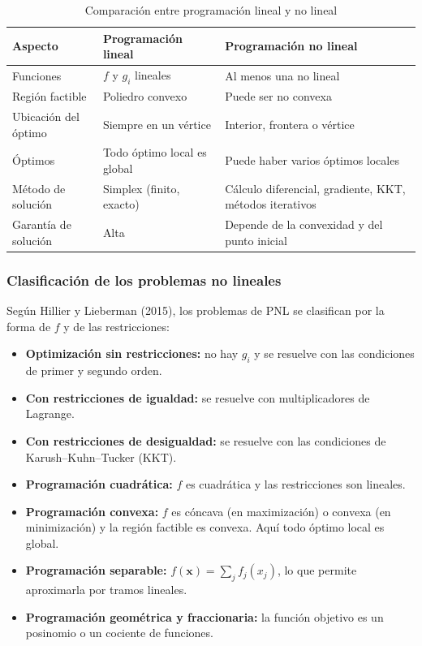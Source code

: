 \documentclass[12pt,letterpaper]{article}
\begin{document}
\begin{table}[H]
	\centering
	\caption{Comparación entre programación lineal y no lineal}
	\label{tab:comparacion}
	\small
	\begin{tabular}{p{3.2cm}p{5.6cm}p{5.6cm}}
		\toprule
		\textbf{Aspecto}     & \textbf{Programación lineal} & \textbf{Programación no lineal}                         \\
		\midrule
		Funciones            & $f$ y $g_i$ lineales         & Al menos una no lineal                                  \\
		Región factible      & Poliedro convexo             & Puede ser no convexa                                    \\
		Ubicación del óptimo & Siempre en un vértice        & Interior, frontera o vértice                            \\
		Óptimos              & Todo óptimo local es global  & Puede haber varios óptimos locales                      \\
		Método de solución   & Simplex (finito, exacto)     & Cálculo diferencial, gradiente, KKT, métodos iterativos \\
		Garantía de solución & Alta                         & Depende de la convexidad y del punto inicial            \\
		\bottomrule
	\end{tabular}
\end{table}

\subsubsection{Clasificación de los problemas no lineales}

Según Hillier y Lieberman (2015), los problemas de PNL se clasifican por la forma de $f$ y de las restricciones:
\begin{itemize}
	\item \textbf{Optimización sin restricciones:} no hay $g_i$ y se resuelve con las condiciones de primer y segundo orden.
	\item \textbf{Con restricciones de igualdad:} se resuelve con multiplicadores de Lagrange.
	\item \textbf{Con restricciones de desigualdad:} se resuelve con las condiciones de Karush--Kuhn--Tucker (KKT).
	\item \textbf{Programación cuadrática:} $f$ es cuadrática y las restricciones son lineales.
	\item \textbf{Programación convexa:} $f$ es cóncava (en maximización) o convexa (en minimización) y la región factible es convexa. Aquí todo óptimo local es global.
	\item \textbf{Programación separable:} $f(\mathbf{x})=\sum_j f_j(x_j)$, lo que permite aproximarla por tramos lineales.
	\item \textbf{Programación geométrica y fraccionaria:} la función objetivo es un posinomio o un cociente de funciones.
\end{itemize}
\end{document}
